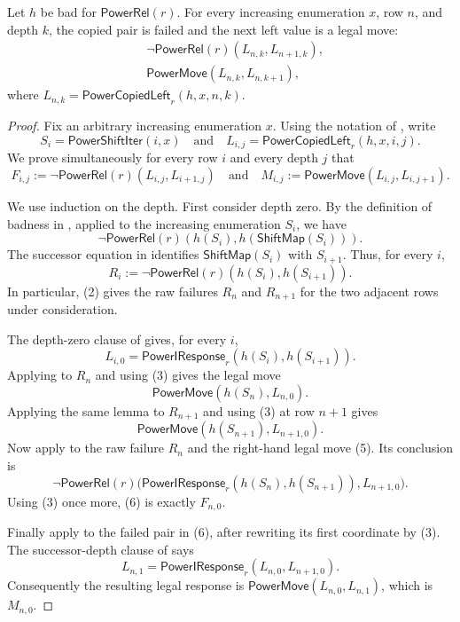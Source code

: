 \begin{lemma}
Let $h$ be bad for $\mathsf{PowerRel}(r)$.  For every increasing
enumeration $x$, row $n$, and depth $k$, the copied pair is failed and the
next left value is a legal move:
\[
\begin{split}
&\neg\mathsf{PowerRel}(r)(L_{n,k},L_{n+1,k}),\\
&\mathsf{PowerMove}(L_{n,k},L_{n,k+1}),
\end{split}
\]
where $L_{n,k}=\mathsf{PowerCopiedLeft}_r(h,x,n,k)$.
\end{lemma}
\begin{proof}
Fix an arbitrary increasing enumeration $x$.  Using the notation of
, write
\[
 S_i=\mathsf{PowerShiftIter}(i,x)
 \quad\text{and}\quad
 L_{i,j}=\mathsf{PowerCopiedLeft}_r(h,x,i,j).
\]
We prove simultaneously for every row $i$ and every depth $j$ that
\[
 F_{i,j}:=\neg\mathsf{PowerRel}(r)(L_{i,j},L_{i+1,j})
 \quad\text{and}\quad
 M_{i,j}:=\mathsf{PowerMove}(L_{i,j},L_{i,j+1}).
\]

We use induction on the depth.  First consider depth zero.  By the definition of badness in
, applied to the increasing enumeration $S_i$,
we have
\[
 \neg\mathsf{PowerRel}(r)(h(S_i),h(\mathsf{ShiftMap}(S_i))).
 \tag{1}
\]
The successor equation in  identifies
$\mathsf{ShiftMap}(S_i)$ with $S_{i+1}$.  Thus, for every $i$,
\[
 R_i:=\neg\mathsf{PowerRel}(r)(h(S_i),h(S_{i+1})).
 \tag{2}
\]
In particular, (2) gives the raw failures $R_n$ and $R_{n+1}$ for the two
adjacent rows under consideration.

The depth-zero clause of  gives, for every $i$,
\[
 L_{i,0}=\mathsf{PowerIResponse}_r(h(S_i),h(S_{i+1})).
 \tag{3}
\]
Applying  to $R_n$ and using (3) gives the
legal move
\[
 \mathsf{PowerMove}(h(S_n),L_{n,0}).
 \tag{4}
\]
Applying the same lemma to $R_{n+1}$ and using (3) at row $n+1$ gives
\[
 \mathsf{PowerMove}(h(S_{n+1}),L_{n+1,0}).
 \tag{5}
\]
Now apply  to the raw failure $R_n$ and the
right-hand legal move (5).  Its conclusion is
\[
 \neg\mathsf{PowerRel}(r)\bigl(
 \mathsf{PowerIResponse}_r(h(S_n),h(S_{n+1})),L_{n+1,0}\bigr).
 \tag{6}
\]
Using (3) once more, (6) is exactly $F_{n,0}$.

Finally apply  to the failed pair in (6), after
rewriting its first coordinate by (3).  The successor-depth clause of
 says
\[
 L_{n,1}=\mathsf{PowerIResponse}_r(L_{n,0},L_{n+1,0}).
 \tag{7}
\]
Consequently the resulting legal response is
$\mathsf{PowerMove}(L_{n,0},L_{n,1})$, which is $M_{n,0}$.


\end{proof}
